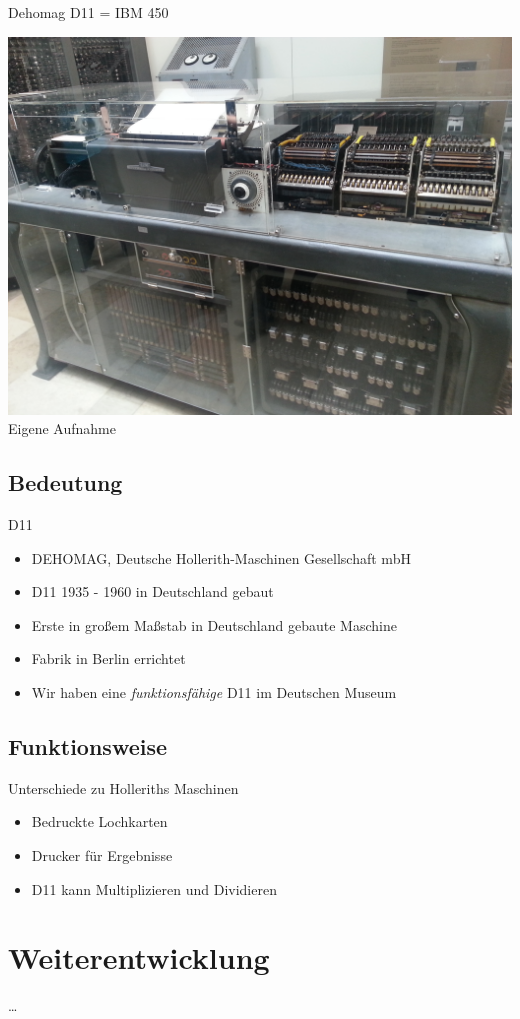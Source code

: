\documentclass[EU2]{beamer}
\begin{document}
\begin{frame}[plain]{Dehomag D11 = IBM 450}
  \begin{center}
    \includegraphics[height=0.95\textheight]{d11}\\
    \tiny{Eigene Aufnahme}
  \end{center}
\end{frame}

\subsection{Bedeutung}

\begin{frame}{D11}
  \begin{itemize}
    \item DEHOMAG, Deutsche Hollerith-Maschinen Gesellschaft mbH
    \item D11 1935 - 1960 in Deutschland gebaut
    \item Erste in großem Maßstab in Deutschland gebaute Maschine
    \item Fabrik in Berlin errichtet
    \item Wir haben eine \emph{funktionsfähige} D11 im Deutschen Museum
  \end{itemize}
\end{frame}

\subsection{Funktionsweise}

\begin{frame}{Unterschiede zu Holleriths Maschinen}
  \begin{itemize}
    \item Bedruckte Lochkarten
    \item Drucker für Ergebnisse
    \item D11 kann Multiplizieren und Dividieren
  \end{itemize}
\end{frame}

\section{Weiterentwicklung}

\begin{frame}{…}
\end{frame}
\end{document}
